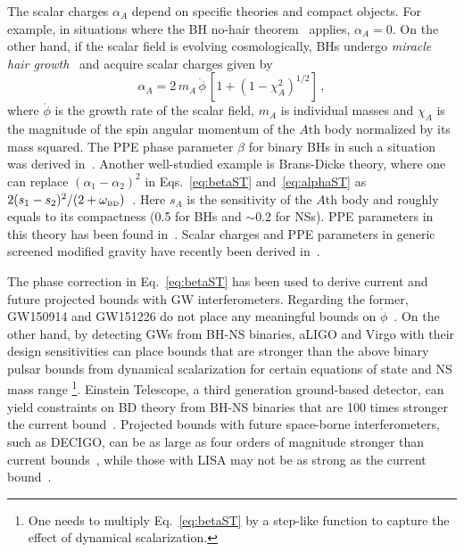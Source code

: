 \documentclass[prd,twocolumn,nofootinbib]{revtex4-1}
\newcommand\be{\begin{equation}}
\newcommand\ee{\end{equation}}
\newcommand{\BD}{{\mbox{\tiny BD}}}
\begin{document}
The scalar charges $\alpha_A$ depend on specific theories and compact objects. For example, in situations where the BH no-hair theorem~\cite{Hawking:1972qk,Bekenstein:1995un,Sotiriou:2011dz} applies, $\alpha_A = 0$. On the other hand, if the scalar field is evolving cosmologically, BHs undergo \emph{miracle hair growth}~\cite{Jacobson:1999vr} and acquire scalar charges given by~\cite{Horbatsch:2011ye}
\be
\alpha_A = 2 \, m_A \, \dot \phi\, [1+(1-\chi_A^2)^{1/2}]\,,
\ee
where $\dot{\phi}$ is the growth rate of the scalar field, $m_A$ is individual masses and $\chi_A$ is the magnitude of the spin angular momentum of the $\mathit{A}\text{th}$ body normalized by its mass squared. The PPE phase parameter $\beta$ for binary BHs in such a situation was derived in~\cite{Yunes:2016jcc}. Another well-studied example is Brans-Dicke theory, where one can replace $(\alpha_1-\alpha_2)^2$ in Eqs.~\eqref{eq:betaST} and~\eqref{eq:alphaST} as $2 (s_1-s_2)^2/(2+\omega_\BD)$~\cite{Freire:2012mg}. Here $s_A$ is the sensitivity of the $A$th body and roughly equals to its compactness (0.5 for BHs and $\sim 0.2$ for NSs). PPE parameters in this theory has been found in~\cite{Chatziioannou:2012rf}. Scalar charges and PPE parameters in generic screened modified gravity have recently been derived in~\cite{Zhang:2017srh,Liu:2018sia}.

The phase correction in Eq.~\eqref{eq:betaST} has been used to derive current and future projected bounds with GW interferometers. Regarding the former, GW150914 and GW151226 do not place any meaningful bounds on $\dot \phi$~\cite{Yunes:2016jcc}. On the other hand, by detecting GWs from BH-NS binaries, aLIGO and Virgo with their design sensitivities can place bounds that are stronger than the above binary pulsar bounds from dynamical scalarization for certain equations of state and NS mass range \cite{Shibata:2013pra,Taniguchi:2014fqa,Sampson:2014qqa,Shao:2017gwu}\footnote{One needs to multiply Eq.~\eqref{eq:betaST} by a step-like function to capture the effect of dynamical scalarization.}. Einstein Telescope, a third generation ground-based detector, can yield constraints on BD theory from BH-NS binaries that are 100 times stronger the current bound~\cite{Zhang:2017sym}. Projected bounds with future space-borne interferometers, such as DECIGO, can be as large as four orders of magnitude stronger than current bounds~\cite{Yagi:2009zz}, while those with LISA may not be as strong as the current bound~\cite{Berti:2004bd,Yagi:2009zm}. 


\end{document}
